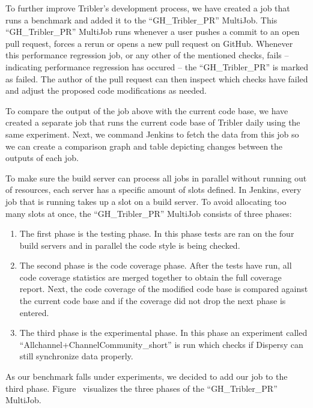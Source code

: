 To further improve Tribler's development process, we have created a job  that runs a  benchmark and added it to the \enquote{GH\_Tribler\_PR} MultiJob.
This \enquote{GH\_Tribler\_PR} MultiJob runs whenever a user pushes a commit to an open pull request, forces a rerun or opens a new pull request on GitHub.
Whenever this performance regression job, or any other of the mentioned checks, fails -- indicating performance regression has occured -- the \enquote{GH\_Tribler\_PR} is marked as failed.
The author of the pull request can then inspect which checks have failed and adjust the proposed code modifications as needed.

To compare the output of the job  above with the current code base, we have created a separate job that runs the current code base of Tribler daily using the same experiment.
Next, we command Jenkins to fetch the data from this job so we can create a comparison graph and table depicting changes between the outputs of each job.

To make sure the build server can process all jobs in parallel without running out of resources, each server has a specific amount of slots defined.
In Jenkins, every job that is running takes up a slot on a build server.
To avoid allocating too many slots at once, the \enquote{GH\_Tribler\_PR} MultiJob consists of three phases:

\begin{enumerate}
	\item The first phase is the testing phase. In this phase tests are ran on the four build servers and in parallel the code style is being checked.
	\item The second phase is the code coverage phase. After the tests have run, all code coverage statistics are merged together to obtain the full coverage report. Next, the code coverage of the modified code base is compared against the current code base and if the coverage did not drop the next phase is entered.
	\item The third phase is the experimental phase. In this phase an experiment called \enquote{Allchannel+ChannelCommunity\_short} is run which checks if Dispersy can still synchronize data properly.
\end{enumerate}

As our benchmark falls under experiments, we decided to add our job to the third phase.
Figure~  visualizes the three phases of the \enquote{GH\_Tribler\_PR} MultiJob.

